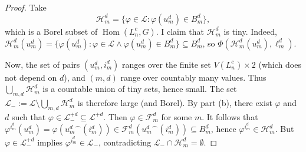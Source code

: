 \documentclass[10pt,a4paper]{amsart}
\DeclareMathOperator{\Hom}{Hom}
\begin{document}
\begin{proof}
    Take $$\mathcal H^d_m=\{\varphi\in\mathcal L:\varphi(u^d_m)\in B^d_m\},$$ which is a Borel subset of $\Hom(L^c_n,G)$.
    I claim that $\mathcal H^d_m$ is tiny.
    Indeed, $\mathcal H^d_m(u^d_m)=\{\varphi(u^d_m):\varphi\in\mathcal L\land\varphi(u^d_m)\in B^d_m\}\subseteq B^d_m$, so $\Phi(\mathcal H^d_m(u^d_m),\ell^d_m)$.
    
    Now, the set of pairs $(u^d_m,i^d_m)$ ranges over the finite set $V(L^c_n)\times2$ (which does not depend on $d$), and $(m,d)$ range over countably many values.
    Thus $\bigcup_{m,d}\mathcal H^d_m$ is a countable union of tiny sets, hence small.
    The set $\mathcal L_-:=\mathcal L\setminus\bigcup_{m,d}\mathcal H^d_m$ is therefore large (and Borel).
    By part (b), there exist $\varphi$ and $d$ such that $\varphi\in\mathcal L_-^{+d}\subseteq\mathcal L^{+d}$.
    Then $\varphi\in\mathcal F^d_m$ for some $m$.
    It follows that $\varphi^{i^d_m}(u^d_m)=\varphi({u^d_m}^\smallfrown(i^d_m))\in\mathcal F^d_m({u^d_m}^\smallfrown(i^d_m))\subseteq B^d_m$, hence $\varphi^{i^d_m}\in\mathcal H^d_m$.
    But $\varphi\in\mathcal L_-^{+d}$ implies $\varphi^{i^d_m}\in\mathcal L_-$, contradicting $\mathcal L_-\cap\mathcal H^d_m=\emptyset$.
\end{proof}
\end{document}
